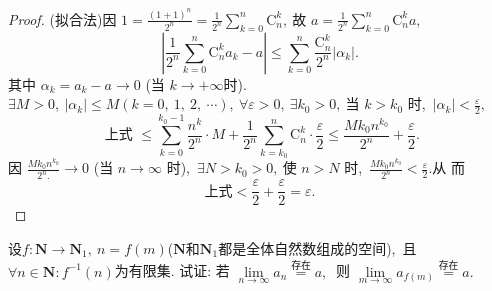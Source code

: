 \begin{proof}
	(拟合法)因  $1=\frac{(1+1)^{n}}{2^{n}}=\frac{1}{2^{n}} \sum\limits_{k=0}^{n} \mathrm{C}_{n}^{k} ,\  $故  $a=\frac{1}{2^{n}} \sum\limits_{k=0}^{n} \mathrm{C}_{n}^{k} a ,\ $
	$$\left|\frac{1}{2^{n}} \sum_{k=0}^{n} \mathrm{C}_{n}^{k} a_{k}-a\right| \leqslant \sum_{k=0}^{n} \frac{\mathrm{C}_{n}^{k}}{2^{n}}\left|\alpha_{k}\right|.$$
	其中 $ \alpha_{k}=a_{k}-a \rightarrow 0 $ (当 $ k \rightarrow+\infty  $时).  $\exists M>0,\ \left|\alpha_{k}\right| \leqslant M(k=0,\ 1,\ 2,\  \cdots),\  \forall \varepsilon>0,\  \exists k_{0}>0 ,\  $当 $ k>k_{0} $ 时,\   $\left|\alpha_{k}\right|<\frac{\varepsilon}{2} ,\ $
	$$\text { 上式 }\leqslant \sum_{k=0}^{k_{0}-1} \frac{n^k}{2^{n}} \cdot M+\frac{1}{2^{n}} \sum_{k=k_{0}}^{n} \mathrm{C}_{n}^{k} \cdot \frac{\varepsilon}{2} \leqslant \frac{M k_{0} n^{k_{0}}}{2^{n}}+\frac{\varepsilon}{2}.$$
	因  $\frac{M k_{0} n^{k_{0}}}{2^{n} .} \rightarrow 0 $ (当  $n \rightarrow \infty $ 时),\   $\exists N>k_{0}>0 ,\  $使 $ n>N $ 时,\   $\frac{M k_{0} n^{k_{0}}}{2^{n}}<\frac{\varepsilon}{2} . $从 而
	$$\text{上式} <\frac{\varepsilon}{2}+\frac{\varepsilon}{2}=\varepsilon .$$
\end{proof}
\newpage
\begin{problem}
	设$f:\mathbf{N}\rightarrow \mathbf{N}_1,\ n=f(m)$($\mathbf{N}$和$\mathbf{N}_1$都是全体自然数组成的空间),\ 且$\forall n \in \mathbf{N}: f^{-1}(n)  $为有限集. 试证: 若  $\lim\limits_{n \rightarrow \infty} a_{n} \stackrel{\text {存在}}{=} a ,\ $ 则  $\lim\limits_{m \rightarrow \infty} a_{f(m)} \stackrel{\text {存在}}{=} a . $
\end{problem}
